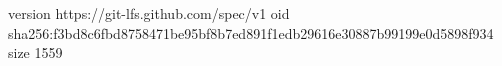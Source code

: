 version https://git-lfs.github.com/spec/v1
oid sha256:f3bd8c6fbd8758471be95bf8b7ed891f1edb29616e30887b99199e0d5898f934
size 1559
